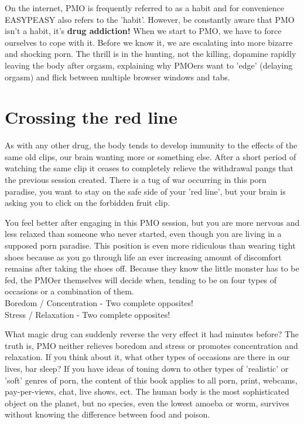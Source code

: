 \documentclass[easypeasy.tex]{subfiles}
\begin{document}
On the internet, PMO is frequently referred to as a habit and for convenience EASYPEASY also refers to the 'habit'. However, be constantly aware that PMO isn't a habit, it's \textbf{drug addiction!} When we start to PMO, we have to force ourselves to cope with it. Before we know it, we are escalating into more bizarre and shocking porn. The thrill is in the hunting, not the killing, dopamine rapidly leaving the body after orgasm, explaining why PMOers want to 'edge' (delaying orgasm) and flick between multiple browser windows and tabs.

\section{Crossing the red line}
As with any other drug, the body tends to develop immunity to the effects of the same old clips, our brain wanting more or something else. After a short period of watching the same clip it ceases to completely relieve the withdrawal pangs that the previous session created. There is a tug of war occurring in this porn paradise, you want to stay on the safe side of your 'red line', but your brain is asking you to click on the forbidden fruit clip.

You feel better after engaging in this PMO session, but you are more nervous and less relaxed than someone who never started, even though you are living in a supposed porn paradise. This position is even more ridiculous than wearing tight shoes because as you go through life an ever increasing amount of discomfort remains after taking the shoes off. Because they know the little monster has to be fed, the PMOer themselves will decide when, tending to be on four types of occasions or a combination of them.\\
  Boredom / Concentration - Two complete opposites!\\
  Stress / Relaxation - Two complete opposites!

What magic drug can suddenly reverse the very effect it had minutes before? The truth is, PMO neither relieves boredom and stress or promotes concentration and relaxation. If you think about it, what other types of occasions are there in our lives, bar sleep? If you have ideas of toning down to other types of 'realistic' or 'soft' genres of porn, the content of this book applies to all porn, print, webcams, pay-per-views, chat, live shows, ect. The human body is the most sophisticated object on the planet, but no species, even the lowest amoeba or worm, survives without knowing the difference between food and poison.
\end{document}
